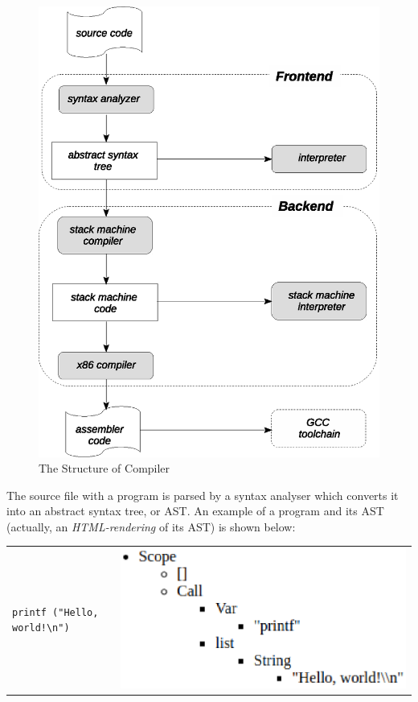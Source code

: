 \begin{figure}[t]
  \centering
  \includegraphics[scale=0.7]{images/01-07.eps}
  \caption{The Structure of \lama Compiler}
  \label{lama-comp}
\end{figure}

The source file with a \lama program is parsed by a syntax analyser which converts it into an
abstract syntax tree, or AST. An example of a program and its AST (actually, an \emph{HTML-rendering}
of its AST) is shown below:

\begin{tabular}{m{5cm}m{5cm}}
  \begin{lstlisting}[basicstyle=\small]
 printf ("Hello, world!\n")
  \end{lstlisting} &
  \includegraphics[scale=0.55]{images/01-08.eps}
\end{tabular}

